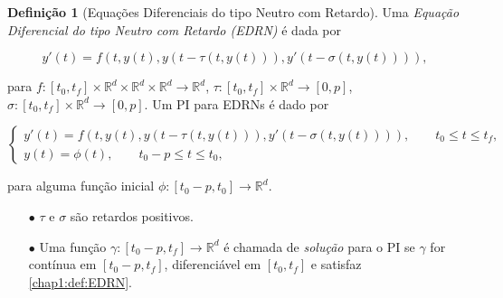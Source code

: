 \documentclass{beamer}
\newcommand{\R}{\mathbb{R}}
\theoremstyle{plain}
\theoremstyle{definition}
\newtheorem{defi}{Definição}
\begin{document}
\begin{frame}
     
    \footnotesize
    \begin{defi}[Equações Diferenciais do tipo Neutro com Retardo]

        Uma \textit{Equação Diferencial do tipo Neutro com Retardo (EDRN)} é dada por

        \begin{equation}
            y'(t) = f(t, y(t), y(t - \tau(t, y(t))), y'(t - \sigma(t, y(t)))), 
        \end{equation}

        para $f:[t_0, t_f] \times \R^d \times \R^d \times \R^d \to \R^d$,  $\tau: [t_0, t_f] \times \R^d \to [0, p]$, $\sigma: [t_0, t_f] \times \R^d \to [0, p]$. Um PI para EDRNs é dado por 

        \begin{equation}
            \begin{cases}
                y'(t) = f(t, y(t), y(t - \tau(t, y(t))), y'(t - \sigma(t, y(t)))), \qquad t_0 \leq t \leq t_f , \\
                y(t) = \phi(t), \qquad t_0 - p \leq t \leq t_0,
            \end{cases}
            \label{chap1:def:EDRN}
        \end{equation}
        
        para alguma função inicial $\phi:[t_0 - p, t_0] \to \R^d $.

        
        \begin{itemize}
            \item[$\bullet$] $\tau$ e $\sigma$ são retardos positivos.
            \item[$\bullet$] Uma função $\gamma:[t_0 - p, t_f] \to \R^d$ é chamada de \textit{solução} para o PI se $\gamma$ for contínua em $[t_0 - p, t_f]$, diferenciável em $[t_0, t_f]$ e satisfaz \eqref{chap1:def:EDRN}.
        \end{itemize}

    \end{defi}

\end{frame}

\end{document}

